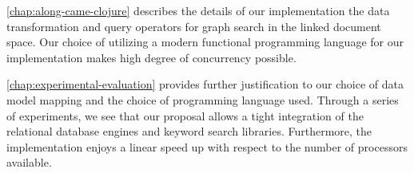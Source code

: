 		\cref{chap:along-came-clojure} describes the details of our implementation the data transformation and query operators for graph search in the linked document space.  Our choice of utilizing a modern functional programming language for our implementation makes high degree of concurrency possible.
		
		\cref{chap:experimental-evaluation} provides further justification to our choice of data model mapping and the choice of programming language used.  Through a series of experiments, we see that our proposal allows a tight integration of the relational database engines and keyword search libraries.  Furthermore, the implementation enjoys a linear speed up with respect to the number of processors available.